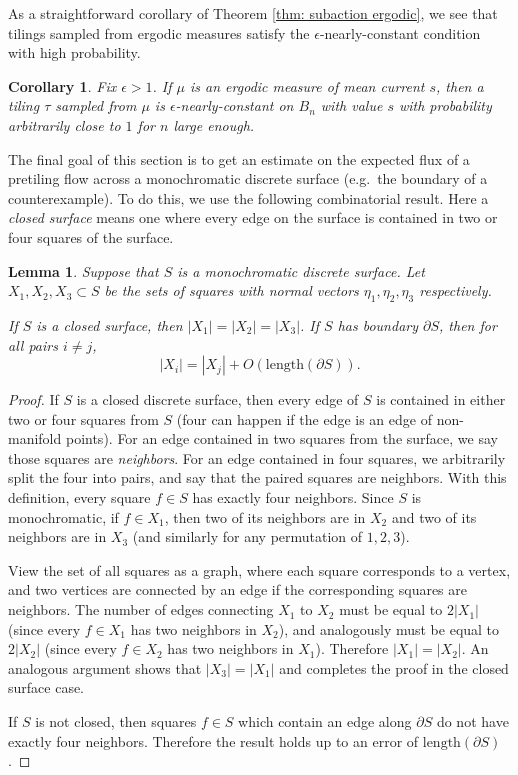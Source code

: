 \documentclass[11pt]{article}
\newtheorem{lemma}[thm]{Lemma}
\newtheorem{cor}[thm]{Corollary}
\theoremstyle{remark}
\theoremstyle{definition}
\begin{document}
As a straightforward corollary of Theorem \ref{thm: subaction ergodic}, we see that tilings sampled from ergodic measures satisfy the $\epsilon$-nearly-constant condition with high probability. 
\begin{cor}\label{cor: ergodic implies nearly constant}
    Fix $\epsilon>1$. If $\mu$ is an ergodic measure of mean current $s$, then a tiling $\tau$ sampled from $\mu$ is $\epsilon$-nearly-constant on $B_n$ with value $s$ with probability arbitrarily close to $1$ for $n$ large enough. 
\end{cor}

The final goal of this section is to get an estimate on the expected flux of a pretiling flow across a monochromatic discrete surface (e.g.\ the boundary of a counterexample). To do this, we use the following combinatorial result. Here a \textit{closed surface} means one where every edge on the surface is contained in two or four squares of the surface.

\begin{lemma}\label{lem: counting squares}
    Suppose that $S$ is a monochromatic discrete surface. Let $X_1,X_2,X_3\subset S$ be the sets of squares with normal vectors $\eta_1,\eta_2,\eta_3$ respectively. 

    If $S$ is a closed surface, then $|X_1|=|X_2|=|X_3|$. If $S$ has boundary $\partial S$, then for all pairs $i\neq j$, $$|X_i|=|X_j|+O(\text{length}(\partial S)).$$
\end{lemma}
\begin{proof}
    If $S$ is a closed discrete surface, then every edge of $S$ is contained in either two or four squares from $S$ (four can happen if the edge is an edge of non-manifold points). For an edge contained in two squares from the surface, we say those squares are \textit{neighbors}. For an edge contained in four squares, we arbitrarily split the four into pairs, and say that the paired squares are neighbors. With this definition, every square $f\in S$ has exactly four neighbors. Since $S$ is monochromatic, if $f\in X_1$, then two of its neighbors are in $X_2$ and two of its neighbors are in $X_3$ (and similarly for any permutation of $1,2,3$). 

    View the set of all squares as a graph, where each square corresponds to a vertex, and two vertices are connected by an edge if the corresponding squares are neighbors. The number of edges connecting $X_1$ to $X_2$ must be equal to $2|X_1|$ (since every $f\in X_1$ has two neighbors in $X_2$), and analogously must be equal to $2|X_2|$ (since every $f\in X_2$ has two neighbors in $X_1$). Therefore $|X_1| = |X_2|$. An analogous argument shows that $|X_3| = |X_1|$ and completes the proof in the closed surface case. 

    If $S$ is not closed, then squares $f\in S$ which contain an edge along $\partial S$ do not have exactly four neighbors. Therefore the result holds up to an error of $\text{length}(\partial S)$. 
\end{proof}
\end{document}
